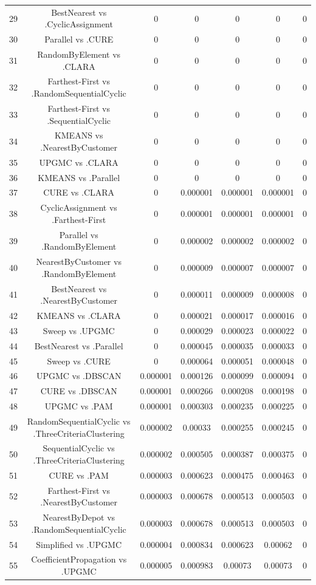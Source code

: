 \documentclass[a4paper,10pt]{article}
\begin{document}
\begin{landscape}
\begin{table}[!htp]
\begin{tabular}{ccccccc}
29&BestNearest vs .CyclicAssignment&0&0&0&0&0\\
30&Parallel vs .CURE&0&0&0&0&0\\
31&RandomByElement vs .CLARA&0&0&0&0&0\\
32&Farthest-First vs .RandomSequentialCyclic&0&0&0&0&0\\
33&Farthest-First vs .SequentialCyclic&0&0&0&0&0\\
34&KMEANS vs .NearestByCustomer&0&0&0&0&0\\
35&UPGMC vs .CLARA&0&0&0&0&0\\
36&KMEANS vs .Parallel&0&0&0&0&0\\
37&CURE vs .CLARA&0&0.000001&0.000001&0.000001&0\\
38&CyclicAssignment vs .Farthest-First&0&0.000001&0.000001&0.000001&0\\
39&Parallel vs .RandomByElement&0&0.000002&0.000002&0.000002&0\\
40&NearestByCustomer vs .RandomByElement&0&0.000009&0.000007&0.000007&0\\
41&BestNearest vs .NearestByCustomer&0&0.000011&0.000009&0.000008&0\\
42&KMEANS vs .CLARA&0&0.000021&0.000017&0.000016&0\\
43&Sweep vs .UPGMC&0&0.000029&0.000023&0.000022&0\\
44&BestNearest vs .Parallel&0&0.000045&0.000035&0.000033&0\\
45&Sweep vs .CURE&0&0.000064&0.000051&0.000048&0\\
46&UPGMC vs .DBSCAN&0.000001&0.000126&0.000099&0.000094&0\\
47&CURE vs .DBSCAN&0.000001&0.000266&0.000208&0.000198&0\\
48&UPGMC vs .PAM&0.000001&0.000303&0.000235&0.000225&0\\
49&RandomSequentialCyclic vs .ThreeCriteriaClustering&0.000002&0.00033&0.000255&0.000245&0\\
50&SequentialCyclic vs .ThreeCriteriaClustering&0.000002&0.000505&0.000387&0.000375&0\\
51&CURE vs .PAM&0.000003&0.000623&0.000475&0.000463&0\\
52&Farthest-First vs .NearestByCustomer&0.000003&0.000678&0.000513&0.000503&0\\
53&NearestByDepot vs .RandomSequentialCyclic&0.000003&0.000678&0.000513&0.000503&0\\
54&Simplified vs .UPGMC&0.000004&0.000834&0.000623&0.00062&0\\
55&CoefficientPropagation vs .UPGMC&0.000005&0.000983&0.00073&0.00073&0\\

\end{tabular}
\end{table}
\end{landscape}
\end{document}
